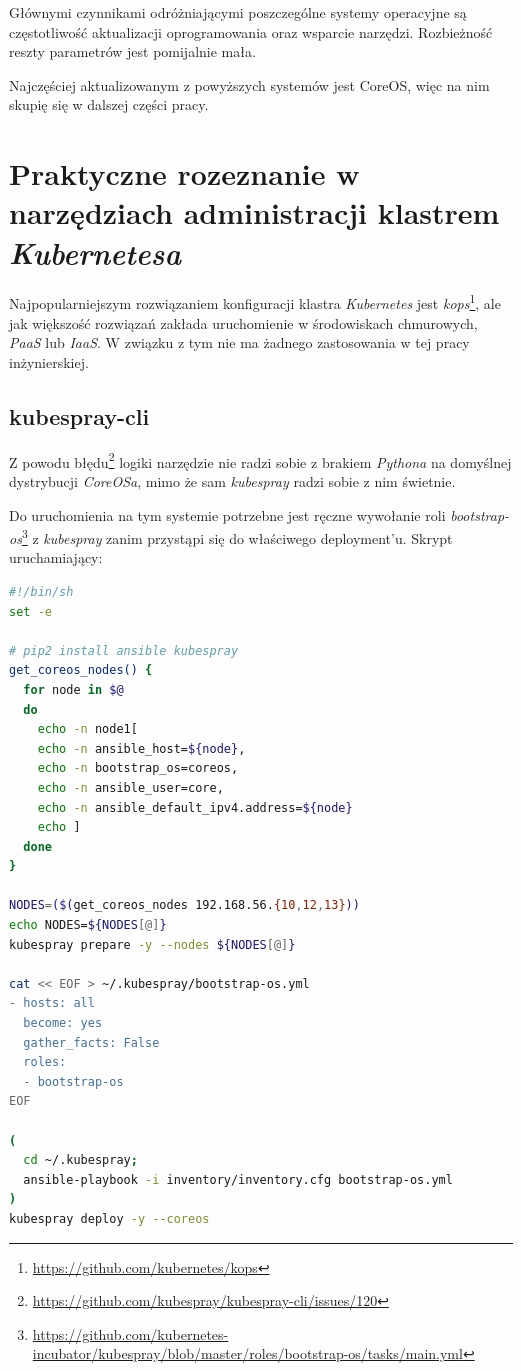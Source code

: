 \documentclass[a4paper,12pt,twoside,openany]{report}
\DeclareRobustCommand{\href}[2]{#2\footnote{\url{#1}}}
\begin{document}
Głównymi czynnikami odróżniającymi poszczególne systemy operacyjne są
częstotliwość aktualizacji oprogramowania oraz wsparcie narzędzi.
Rozbieżność reszty parametrów jest pomijalnie mała.

Najczęściej aktualizowanym z powyższych systemów jest CoreOS, więc na
nim skupię się w dalszej części pracy.

\hypertarget{praktyczne-rozeznanie-w-narzux119dziach-administracji-klastrem-kubernetesa}{%
\chapter{\texorpdfstring{Praktyczne rozeznanie w narzędziach
administracji klastrem
\emph{Kubernetesa}}{Praktyczne rozeznanie w narzędziach administracji klastrem Kubernetesa}}\label{praktyczne-rozeznanie-w-narzux119dziach-administracji-klastrem-kubernetesa}}

Najpopularniejszym rozwiązaniem konfiguracji klastra \emph{Kubernetes}
jest \href{https://github.com/kubernetes/kops}{\emph{kops}}, ale jak
większość rozwiązań zakłada uruchomienie w środowiskach chmurowych,
\emph{PaaS} lub \emph{IaaS}. W związku z tym nie ma żadnego zastosowania
w tej pracy inżynierskiej.

\hypertarget{kubespray-cli-1}{%
\section{kubespray-cli}\label{kubespray-cli-1}}

Z powodu
\href{https://github.com/kubespray/kubespray-cli/issues/120}{błędu}
logiki narzędzie nie radzi sobie z brakiem \emph{Pythona} na domyślnej
dystrybucji \emph{CoreOSa}, mimo że sam \emph{kubespray} radzi sobie z
nim świetnie.

Do uruchomienia na tym systemie potrzebne jest ręczne wywołanie roli
\href{https://github.com/kubernetes-incubator/kubespray/blob/master/roles/bootstrap-os/tasks/main.yml}{\emph{bootstrap-os}}
z \emph{kubespray} zanim przystąpi się do właściwego deployment'u.
Skrypt uruchamiający:

\begin{lstlisting}[language=bash]
#!/bin/sh
set -e

# pip2 install ansible kubespray
get_coreos_nodes() {
  for node in $@
  do
    echo -n node1[
    echo -n ansible_host=${node},
    echo -n bootstrap_os=coreos,
    echo -n ansible_user=core,
    echo -n ansible_default_ipv4.address=${node}
    echo ]
  done
}

NODES=($(get_coreos_nodes 192.168.56.{10,12,13}))
echo NODES=${NODES[@]}
kubespray prepare -y --nodes ${NODES[@]}

cat << EOF > ~/.kubespray/bootstrap-os.yml
- hosts: all
  become: yes
  gather_facts: False
  roles:
  - bootstrap-os
EOF

(
  cd ~/.kubespray;
  ansible-playbook -i inventory/inventory.cfg bootstrap-os.yml
)
kubespray deploy -y --coreos
\end{lstlisting}
\end{document}
